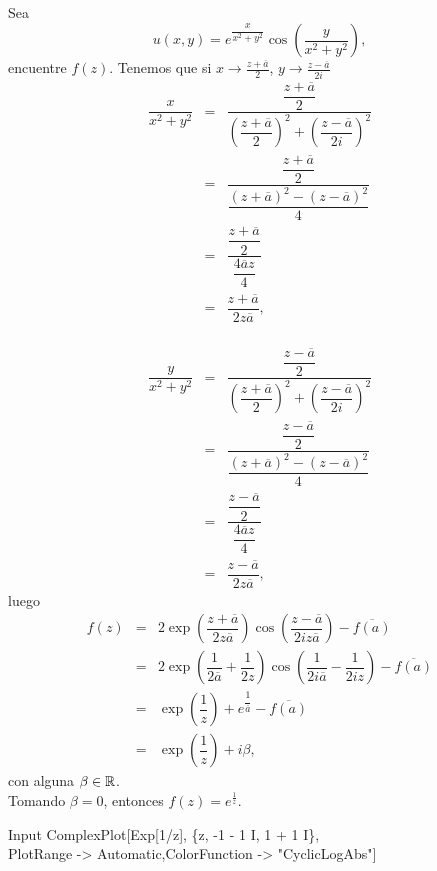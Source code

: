 \begin{Ejem}
	Sea $$u(x,y)=e^{\dfrac{x}{x^2+y^2}}\cos\left(\dfrac{y}{x^2+y^2}\right),$$  encuentre $f(z)$.
	\solu Tenemos que si $x\rightarrow\frac{z+\overline{a}}{2}$, $y\rightarrow\frac{z-\overline{a}}{2i}$
	\[
		\begin{array}{ccl}
			\dfrac{x}{x^2+y^2}&=&\dfrac{\dfrac{z+\overline{a}}{2}}{\left(\dfrac{z+\overline{a}}{2}\right)^2+\left(\dfrac{z-\overline{a}}{2i}\right)^2}\\
			&=&\dfrac{\dfrac{z+\overline{a}}{2}}{\dfrac{(z+\overline{a})^2-(z-\overline{a})^2}{4}}\\
			&=&\dfrac{\dfrac{z+\overline{a}}{2}}{\dfrac{4\overline{a}z}{4}}\\
			&=&\dfrac{z+\overline{a}}{2z\overline{a}},\\
				\end{array}
			\]
			
			\[
			\begin{array}{ccl}
			\dfrac{y}{x^2+y^2}&=&\dfrac{\dfrac{z-\overline{a}}{2}}{\left(\dfrac{z+\overline{a}}{2}\right)^2+\left(\dfrac{z-\overline{a}}{2i}\right)^2}\\
			&=&\dfrac{\dfrac{z-\overline{a}}{2}}{\dfrac{(z+\overline{a})^2-(z-\overline{a})^2}{4}}\\
			&=&\dfrac{\dfrac{z-\overline{a}}{2}}{\dfrac{4\overline{a}z}{4}}\\
			&=&\dfrac{z-\overline{a}}{2z\overline{a}},
		\end{array}
	\]
	luego
	\[
		\begin{array}{ccl}
			f(z)&=&2\exp\left({\dfrac{z+\overline{a}}{2z\overline{a}}}\right)\cos\left(\dfrac{z-\overline{a}}{2iz\overline{a}}  \right)-\overline{f(a)}\\
			&=&2\exp\left({\dfrac{1}{2\overline{a}}+\dfrac{1}{2z}}\right)\cos\left(\dfrac{1}{2i\overline{a}}-\dfrac{1}{2iz}\right)-\overline{f(a)}\\
			&=&\exp\left({\dfrac{1}{z}}\right)+e^{\dfrac{1}{\overline{a}}}-\overline{f(a)}\\
			&=&\exp\left({\dfrac{1}{z}}\right)+i\beta,
		\end{array}
	\]
	con alguna $\beta\in \mathbb{R}$.\\
	Tomando $\beta=0$,  entonces $f(z)=e^{\frac{1}{z}}$.\begin{mmaCell}{Input}
		ComplexPlot[Exp[1/z], \{z, -1 - 1 I, 1 + 1 I\},\\PlotRange -> Automatic,ColorFunction -> "CyclicLogAbs"]
	\end{mmaCell}
	

\end{Ejem}
